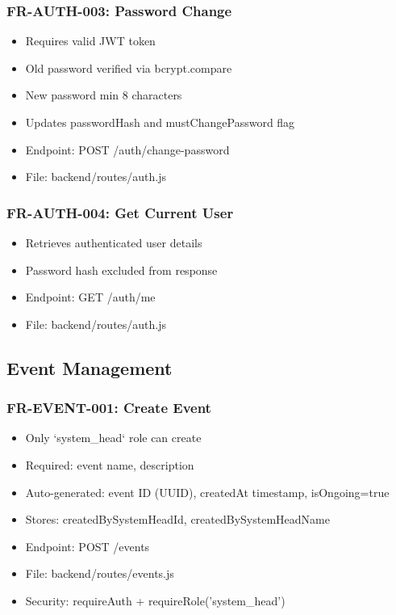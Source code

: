 \documentclass[12pt,a4paper]{article}
\begin{document}
\subsubsection{FR-AUTH-003: Password Change}
\begin{itemize}
  \item Requires valid JWT token
  \item Old password verified via bcrypt.compare
  \item New password min 8 characters
  \item Updates passwordHash and mustChangePassword flag
  \item Endpoint: POST /auth/change-password
  \item File: backend/routes/auth.js
\end{itemize}

\subsubsection{FR-AUTH-004: Get Current User}
\begin{itemize}
  \item Retrieves authenticated user details
  \item Password hash excluded from response
  \item Endpoint: GET /auth/me
  \item File: backend/routes/auth.js
\end{itemize}

\subsection{Event Management}

\subsubsection{FR-EVENT-001: Create Event}
\begin{itemize}
  \item Only `system\_head` role can create
  \item Required: event name, description
  \item Auto-generated: event ID (UUID), createdAt timestamp, isOngoing=true
  \item Stores: createdBySystemHeadId, createdBySystemHeadName
  \item Endpoint: POST /events
  \item File: backend/routes/events.js
  \item Security: requireAuth + requireRole('system\_head')
\end{itemize}
\end{document}
